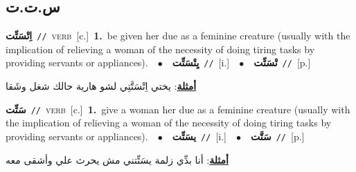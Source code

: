 \documentclass[10pt,a4paper,twoside]{article} %
\begin{document}
\begin{multicols}{2}
{{{{{{{{{{{{{\vspace{-3mm}
\subsection*{\color{blue}\foreignlanguage{arabic}{س.ت.ت}\color{blue}{}} 

{\setlength\topsep{0pt}\textbf{\foreignlanguage{arabic}{اِتْسَتِّت}}\ {\color{gray}\texttt{//}\color{black}}\ \textsc{verb}\ [c.]\ \textbf{1.}~be given her due as a feminine creature (usually with the implication of relieving a woman of the necessity of doing tiring tasks by providing servants or appliances).\ \ $\bullet$\ \ \setlength\topsep{0pt}\textbf{\foreignlanguage{arabic}{يِتْسَتِّت}}\ {\color{gray}\texttt{//}\color{black}}\ [i.]\ \ $\bullet$\ \ \setlength\topsep{0pt}\textbf{\foreignlanguage{arabic}{تْسَتِّت}}\ {\color{gray}\texttt{//}\color{black}}\ [p.]\  \begin{flushright}\color{gray}\foreignlanguage{arabic}{\textbf{\underline{\foreignlanguage{arabic}{أمثلة}}}: يختي اِتْسَتَّتِي لشو هارية حالك شغل وشَقا}\end{flushright}\color{black}} \vspace{2mm}

{\setlength\topsep{0pt}\textbf{\foreignlanguage{arabic}{سَتِّت}}\ {\color{gray}\texttt{//}\color{black}}\ \textsc{verb}\ [c.]\ \textbf{1.}~give a woman her due as a feminine creature (usually with the implication of relieving a woman of the necessity of doing tiring tasks by providing servants or appliances).\ \ $\bullet$\ \ \setlength\topsep{0pt}\textbf{\foreignlanguage{arabic}{يسَتِّت}}\ {\color{gray}\texttt{//}\color{black}}\ [i.]\ \ $\bullet$\ \ \setlength\topsep{0pt}\textbf{\foreignlanguage{arabic}{سَتَّت}}\ {\color{gray}\texttt{//}\color{black}}\ [p.]\  \begin{flushright}\color{gray}\foreignlanguage{arabic}{\textbf{\underline{\foreignlanguage{arabic}{أمثلة}}}: أنا بدِّي زلمة يسَتِّتني مش يحرث علي وأشقى معه}\end{flushright}\color{black}} \vspace{2mm}

}}}}}}}}}}}}}
\end{multicols}
\end{document}
